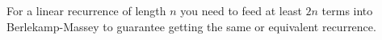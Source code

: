 For a linear recurrence of length $n$ you need to feed at least $2n$ terms into Berlekamp-Massey to guarantee getting the same or equivalent recurrence.